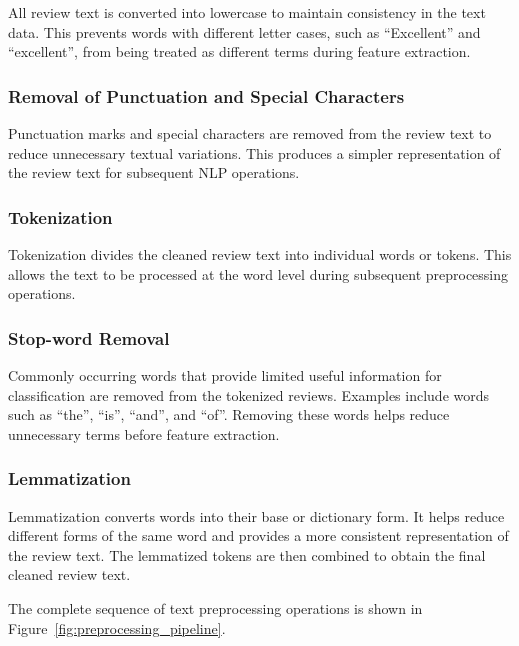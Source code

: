 \documentclass[12pt,a4paper]{report}
\begin{document}
All review text is converted into lowercase to maintain consistency in the text data. This prevents words with different letter cases, such as ``Excellent'' and ``excellent'', from being treated as different terms during feature extraction.

\subsubsection*{Removal of Punctuation and Special Characters}

Punctuation marks and special characters are removed from the review text to reduce unnecessary textual variations. This produces a simpler representation of the review text for subsequent NLP operations.

\subsubsection*{Tokenization}

Tokenization divides the cleaned review text into individual words or tokens. This allows the text to be processed at the word level during subsequent preprocessing operations.

\subsubsection*{Stop-word Removal}

Commonly occurring words that provide limited useful information for classification are removed from the tokenized reviews. Examples include words such as ``the'', ``is'', ``and'', and ``of''. Removing these words helps reduce unnecessary terms before feature extraction.

\subsubsection*{Lemmatization}

Lemmatization converts words into their base or dictionary form. It helps reduce different forms of the same word and provides a more consistent representation of the review text. The lemmatized tokens are then combined to obtain the final cleaned review text.

The complete sequence of text preprocessing operations is shown in Figure~\ref{fig:preprocessing_pipeline}.
\end{document}
